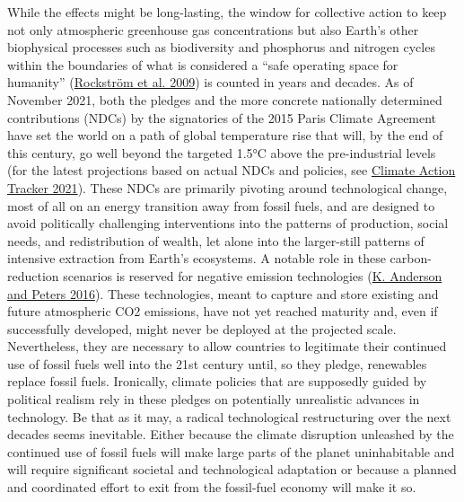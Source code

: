 \documentclass[a4paper, nobind]{templates/ociamthesis}
\begin{document}
While the effects might be long-lasting, the window for collective action to keep not only atmospheric greenhouse gas concentrations but also Earth's other biophysical processes such as biodiversity and phosphorus and nitrogen cycles within the boundaries of what is considered a ``safe operating space for humanity'' (\protect\hyperlink{ref-rockstrom_planetary_2009}{Rockström et al. 2009}) is counted in years and decades. As of November 2021, both the pledges and the more concrete nationally determined contributions (NDCs) by the signatories of the 2015 Paris Climate Agreement have set the world on a path of global temperature rise that will, by the end of this century, go well beyond the targeted 1.5°C above the pre-industrial levels (for the latest projections based on actual NDCs and policies, see \protect\hyperlink{ref-climate_action_tracker_cat_2021}{Climate Action Tracker 2021}). These NDCs are primarily pivoting around technological change, most of all on an energy transition away from fossil fuels, and are designed to avoid politically challenging interventions into the patterns of production, social needs, and redistribution of wealth, let alone into the larger-still patterns of intensive extraction from Earth's ecosystems. A notable role in these carbon-reduction scenarios is reserved for negative emission technologies (\protect\hyperlink{ref-anderson_trouble_2016}{K. Anderson and Peters 2016}). These technologies, meant to capture and store existing and future atmospheric CO2 emissions, have not yet reached maturity and, even if successfully developed, might never be deployed at the projected scale. Nevertheless, they are necessary to allow countries to legitimate their continued use of fossil fuels well into the 21st century until, so they pledge, renewables replace fossil fuels. Ironically, climate policies that are supposedly guided by political realism rely in these pledges on potentially unrealistic advances in technology. Be that as it may, a radical technological restructuring over the next decades seems inevitable. Either because the climate disruption unleashed by the continued use of fossil fuels will make large parts of the planet uninhabitable and will require significant societal and technological adaptation or because a planned and coordinated effort to exit from the fossil-fuel economy will make it so.
\end{document}
